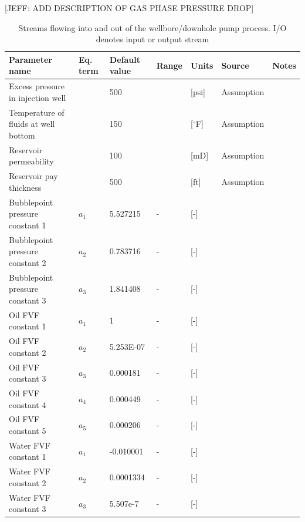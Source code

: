 \documentclass[11pt]{report}
\begin{document}
[JEFF: ADD DESCRIPTION OF GAS PHASE PRESSURE DROP]




\begin{table}
\caption{Streams flowing into and out of the wellbore/downhole pump process. I/O denotes input or output stream}
\label{tab:wellbore_PF}
\begin{scriptsize}
\begin{tabularx}{1\columnwidth}{p{}p{}p{}p{}p{}p{}p{}}
\toprule
Parameter name					& Eq. term			& Default value   & Range		& Units 	& Source			      			& Notes 		\\ 
\midrule
Excess pressure in injection well		&					& 500		&			& [psi]	& Assumption					& \\
Temperature of fluids at well bottom		&					& 150		&			& [$^\circ$F] & Assumption				& \\
Reservoir permeability				&					& 100		&			& [mD]	& Assumption					& \\
Reservoir pay thickness				&					& 500		&			& [ft]		& Assumption					& \\
Bubblepoint pressure constant 1		&	$a_1$			& 5.527215 	& - 			&  [-] 	& \cite{AlShammasi1999} 			& \\
Bubblepoint pressure constant 2		&	$a_2$			& 0.783716 	& - 			&  [-] 	& \cite{AlShammasi1999} 			& \\
Bubblepoint pressure constant 3		&	$a_3$			& 1.841408 	& - 			&  [-] 	& \cite{AlShammasi1999} 			& \\
Oil FVF constant 1					&	$a_1$			& 1 		  	& - 			&  [-] 	& \cite{AlShammasi1999} 			& \\
Oil FVF constant 2					&	$a_2$			& 5.253E-07 	& - 			&  [-] 	& \cite{AlShammasi1999} 			& \\
Oil FVF constant 3					&	$a_3$			& 0.000181 	& - 			&  [-] 	& \cite{AlShammasi1999} 			& \\
Oil FVF constant 4					&	$a_4$			& 0.000449 	& - 			&  [-] 	& \cite{AlShammasi1999} 			& \\
Oil FVF constant 5					&	$a_5$			& 0.000206 	& - 			&  [-] 	& \cite{AlShammasi1999} 			& \\
Water FVF constant 1				&	$a_1$			& -0.010001 	& - 			&  [-] 	& \cite{AlShammasi1999} 			& \\
Water FVF constant 2				&	$a_2$			& 0.0001334 	& - 			&  [-] 	& \cite{McCain1990} 				& \\
Water FVF constant 3				&	$a_3$			& 5.507e-7	& - 			&  [-] 	& \cite{McCain1990} 				& \\

\end{tabularx}
\end{scriptsize}
\end{table}
\end{document}
